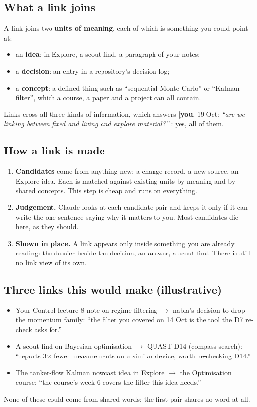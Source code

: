 \documentclass[10pt]{extarticle}
\newcommand{\you}[2]{{\small[\textbf{you}, #1: \textit{``#2''}]}}
\newcommand{\Sub}[1]{\subsection*{#1}}
\begin{document}
\Sub{What a link joins}
A link joins two \textbf{units of meaning}, each of which is something you could point at:
\begin{itemize}
\item an \textbf{idea}: in Explore, a scout find, a paragraph of your notes;
\item a \textbf{decision}: an entry in a repository's decision log;
\item a \textbf{concept}: a defined thing such as ``sequential Monte Carlo'' or ``Kalman filter'', which a course, a paper and a project can all contain.
\end{itemize}
Links cross all three kinds of information, which answers \you{19 Oct}{are we linking between fixed and living and explore material?}: yes, all of them.

\Sub{How a link is made}
\begin{enumerate}
\item \textbf{Candidates} come from anything new: a change record, a new source, an Explore idea. Each is matched against existing units by meaning and by shared concepts. This step is cheap and runs on everything.
\item \textbf{Judgement.} Claude looks at each candidate pair and keeps it only if it can write the one sentence saying why it matters to you. Most candidates die here, as they should.
\item \textbf{Shown in place.} A link appears only inside something you are already reading: the dossier beside the decision, an answer, a scout find. There is still no link view of its own.
\end{enumerate}

\Sub{Three links this would make (illustrative)}
\begin{itemize}
\item Your Control lecture 8 note on regime filtering $\to$ nabla's decision to drop the momentum family: ``the filter you covered on 14 Oct is the tool the D7 re-check asks for.''
\item A scout find on Bayesian optimisation $\to$ QUAST D14 (compass search): ``reports 3$\times$ fewer measurements on a similar device; worth re-checking D14.''
\item The tanker-flow Kalman nowcast idea in Explore $\to$ the Optimisation course: ``the course's week 6 covers the filter this idea needs.''
\end{itemize}
None of these could come from shared words: the first pair shares no word at all.
\end{document}
